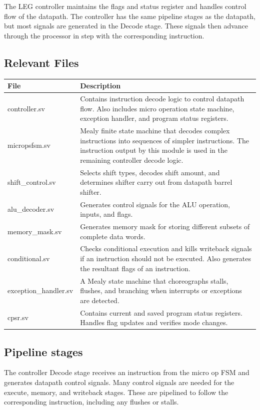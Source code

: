 \label{sec:c}
The LEG controller maintains the flags and status register and handles control flow of the datapath.
The controller has the same pipeline stages as the datapath, but most signals are generated in the Decode stage. 
These signals then advance through the processor in step with the corresponding instruction.

\subsection{Relevant Files}
\begin{tabular}{|l|p{120mm}|}
\hline \textbf{File}  & \textbf{Description} \\ 
\hline controller.sv & Contains instruction decode logic to control datapath flow. Also includes micro operation state machine, exception handler, and program status registers.\\ 
\hline micropsfsm.sv & Mealy finite state machine that decodes complex instructions into sequences of simpler instructions. The instruction output by this module is used in the remaining controller decode logic.\\ 
\hline shift\_control.sv & Selects shift types, decodes shift amount, and determines shifter carry out from datapath barrel shifter. \\ 
\hline alu\_decoder.sv & Generates control signals for the ALU operation, inputs, and flags.\\
\hline memory\_mask.sv & Generates memory mask for storing different subsets of complete data words. \\
\hline conditional.sv & Checks conditional execution and kills writeback signals if an instruction should not be executed. Also generates the resultant flags of an instruction.\\
\hline exception\_handler.sv & A Mealy state machine that choreographs stalls, flushes, and branching when interrupts or exceptions are detected.\\
\hline cpsr.sv & Contains current and saved program status registers. Handles flag updates and verifies mode changes. \\
\hline 
\end{tabular} 


\subsection{Pipeline stages}
The controller Decode stage receives an instruction from the micro op FSM and generates datapath control signals.
Many control signals are needed for the execute, memory, and writeback stages. 
These are pipelined to follow the corresponding instruction, including any flushes or stalls.

